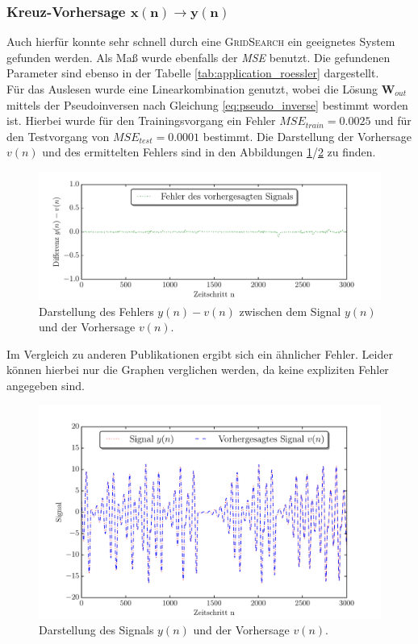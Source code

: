 \subsubsection[Kreuz-Vorhersage $x(n) \rightarrow y(n)$]{Kreuz-Vorhersage $\pmb{x(n) \rightarrow y(n)}$}
Auch hierfür konnte sehr schnell durch eine \textsc{GridSearch} ein geeignetes System gefunden werden. Als Maß wurde ebenfalls der \textit{MSE} benutzt. Die gefundenen Parameter sind ebenso in der Tabelle \ref{tab:application_roessler} dargestellt.\\
Für das Auslesen wurde eine Linearkombination genutzt, wobei die Lösung $\mathbf{W}_{out}$ mittels der Pseudoinversen nach Gleichung \ref{eq:pseudo_inverse} bestimmt worden ist.
Hierbei wurde für den Trainingsvorgang ein Fehler $MSE_{train} = 0.0025$ und für den Testvorgang von $MSE_{test} = 0.0001$ bestimmt. Die Darstellung der Vorhersage $v(n)$ und des ermittelten Fehlers sind in den Abbildungen \ref{fig:application_roessler_b1}/\ref{fig:application_roessler_b2} zu finden.

\begin{figure}[H]
    \centering
     \includegraphics[width = 0.9 \textwidth]{figures/roessler_cross_err.pdf}
    \caption{Darstellung des Fehlers $y(n)-v(n)$ zwischen dem Signal $y(n)$ und der Vorhersage $v(n)$.}
    \label{fig:application_roessler_b1}
\end{figure}
 Im Vergleich zu anderen Publikationen \cite{parlitz2005} ergibt sich ein ähnlicher Fehler. Leider können hierbei nur die Graphen verglichen werden, da keine expliziten Fehler angegeben sind.


\begin{figure}[H]
    \centering
     \includegraphics[width = 0.9 \textwidth]{figures/roessler_cross_pred.pdf}
      \caption{Darstellung des Signals $y(n)$ und der Vorhersage $v(n)$.}
    \label{fig:application_roessler_b2}
\end{figure}

